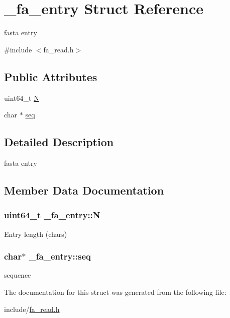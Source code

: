 \hypertarget{struct__fa__entry}{\section{\+\_\+fa\+\_\+entry Struct Reference}
\label{struct__fa__entry}
}


fasta entry  




{\ttfamily \#include $<$fa\+\_\+read.\+h$>$}

\subsection*{Public Attributes}
\begin{DoxyCompactItemize}
\item 
uint64\+\_\+t \hyperlink{struct__fa__entry_a46bfe034cc419f00fccd2d7d174c76e2}{N}
\item 
char $\ast$ \hyperlink{struct__fa__entry_a6c548e86ed6ce8bb33bd1fcdcd56abbe}{seq}
\end{DoxyCompactItemize}


\subsection{Detailed Description}
fasta entry 

\subsection{Member Data Documentation}
\hypertarget{struct__fa__entry_a46bfe034cc419f00fccd2d7d174c76e2}{
\subsubsection[{N}]{\setlength{\rightskip}{0pt plus 5cm}uint64\+\_\+t \+\_\+fa\+\_\+entry\+::\+N}}\label{struct__fa__entry_a46bfe034cc419f00fccd2d7d174c76e2}
Entry length (chars) \hypertarget{struct__fa__entry_a6c548e86ed6ce8bb33bd1fcdcd56abbe}{
\subsubsection[{seq}]{\setlength{\rightskip}{0pt plus 5cm}char$\ast$ \+\_\+fa\+\_\+entry\+::seq}}\label{struct__fa__entry_a6c548e86ed6ce8bb33bd1fcdcd56abbe}
sequence 

The documentation for this struct was generated from the following file\+:\begin{DoxyCompactItemize}
\item 
include/\hyperlink{fa__read_8h}{fa\+\_\+read.\+h}\end{DoxyCompactItemize}
